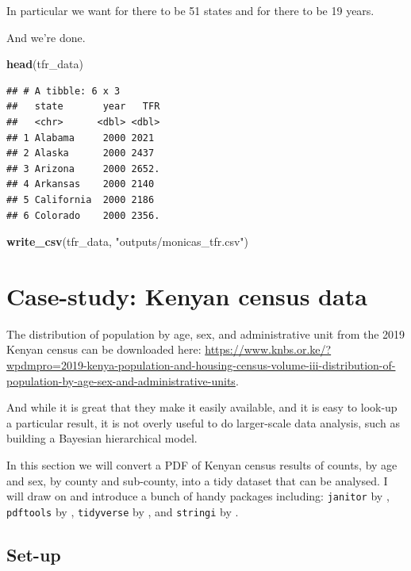 \documentclass[
]{book}
\newenvironment{Shaded}{\begin{snugshade}}{\end{snugshade}}
\newcommand{\KeywordTok}[1]{\textcolor[rgb]{0.13,0.29,0.53}{\textbf{#1}}}
\newcommand{\NormalTok}[1]{#1}
\newcommand{\StringTok}[1]{\textcolor[rgb]{0.31,0.60,0.02}{#1}}
\begin{document}
In particular we want for there to be 51 states and for there to be 19 years.

And we're done.

\begin{Shaded}
\begin{Highlighting}[]
\KeywordTok{head}\NormalTok{(tfr_data)}
\end{Highlighting}
\end{Shaded}

\begin{verbatim}
## # A tibble: 6 x 3
##   state       year   TFR
##   <chr>      <dbl> <dbl>
## 1 Alabama     2000 2021 
## 2 Alaska      2000 2437 
## 3 Arizona     2000 2652.
## 4 Arkansas    2000 2140 
## 5 California  2000 2186 
## 6 Colorado    2000 2356.
\end{verbatim}

\begin{Shaded}
\begin{Highlighting}[]
\KeywordTok{write_csv}\NormalTok{(tfr_data, }\StringTok{"outputs/monicas_tfr.csv"}\NormalTok{)}
\end{Highlighting}
\end{Shaded}

\hypertarget{case-study-kenyan-census-data}{%
\section{Case-study: Kenyan census data}\label{case-study-kenyan-census-data}}

The distribution of population by age, sex, and administrative unit from the 2019 Kenyan census can be downloaded here: \url{https://www.knbs.or.ke/?wpdmpro=2019-kenya-population-and-housing-census-volume-iii-distribution-of-population-by-age-sex-and-administrative-units}.

And while it is great that they make it easily available, and it is easy to look-up a particular result, it is not overly useful to do larger-scale data analysis, such as building a Bayesian hierarchical model.

In this section we will convert a PDF of Kenyan census results of counts, by age and sex, by county and sub-county, into a tidy dataset that can be analysed. I will draw on and introduce a bunch of handy packages including: \texttt{janitor} by \citet{janitor}, \texttt{pdftools} by \citet{pdftools}, \texttt{tidyverse} by \citet{tidyverse}, and \texttt{stringi} by \citet{stringi}.

\hypertarget{set-up}{%
\subsection{Set-up}\label{set-up}}
\end{document}
